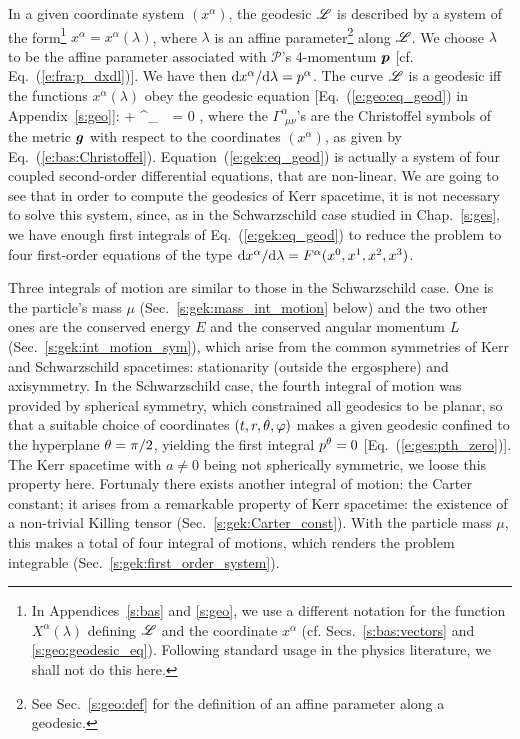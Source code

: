In a given coordinate system $(x^\alpha)$, the geodesic $\mathscr{L}$ is described
by a system of the form\footnote{In Appendices~\ref{s:bas} and \ref{s:geo},
we use a different notation for the function $X^\alpha(\lambda)$ defining
$\mathscr{L}$ and the coordinate $x^\alpha$ (cf. Secs.~\ref{s:bas:vectors} and
\ref{s:geo:geodesic_eq}). Following standard usage in the physics literature,
we shall not do this here.}
$x^\alpha = x^\alpha(\lambda)$, where $\lambda$ is an
affine parameter\footnote{See Sec.~\ref{s:geo:def} for the definition
of an affine parameter along a geodesic.} along $\mathscr{L}$. We choose $\lambda$ to be the affine parameter
associated with $\mathscr{P}$'s 4-momentum $\bm{p}$ [cf. Eq.~(\ref{e:fra:p_dxdl})]. We have
then $\mathrm{d} x^\alpha / \mathrm{d}\lambda = p^\alpha$.
The curve $\mathscr{L}$ is a geodesic iff the functions $x^\alpha(\lambda)$ obey
the geodesic equation [Eq.~(\ref{e:geo:eq_geod}) in Appendix~\ref{s:geo}]:
\be \label{e:gek:eq_geod}
     + \Gamma^\alpha_{\ \, \mu \nu}
      = 0 ,
\ee
where the $\Gamma^\alpha_{\ \, \mu \nu}$'s are the Christoffel symbols of the metric $\bm{g}$
with respect to the coordinates $(x^\alpha)$, as given by Eq.~(\ref{e:bas:Christoffel}).
Equation~(\ref{e:gek:eq_geod}) is actually a system of four coupled second-order
differential equations, that are non-linear. We are going to see that in
order to compute the geodesics of Kerr spacetime, it is not necessary to
solve this system, since, as in the Schwarzschild case studied in Chap.~\ref{s:ges}, we have
enough first integrals of Eq.~(\ref{e:gek:eq_geod}) to reduce
the problem to four first-order equations
of the type $\mathrm{d} x^\alpha/\mathrm{d}\lambda = F^\alpha(x^0, x^1, x^2, x^3)$.

Three integrals of motion are similar to those in the Schwarzschild case.
One is the particle's mass $\mu$ (Sec.~\ref{s:gek:mass_int_motion} below)
and the two other ones are
the conserved energy $E$ and the conserved angular momentum
$L$ (Sec.~\ref{s:gek:int_motion_sym}), which arise from the common symmetries
of Kerr and Schwarzschild spacetimes: stationarity (outside the ergosphere) and axisymmetry.
In the Schwarzschild case, the fourth integral of motion was provided by
spherical symmetry, which constrained all geodesics to be planar, so that
a suitable choice of
coordinates $(t,r,\theta,\varphi)$ makes a given geodesic confined to the
hyperplane $\theta=\pi/2$, yielding the first integral $p^\theta=0$ [Eq.~(\ref{e:ges:pth_zero})].
The Kerr spacetime with $a\not=0$ being not spherically symmetric, we loose
this property here. Fortunaly there exists another
integral of motion: the Carter constant; it arises from a remarkable property
of Kerr spacetime: the existence of a non-trivial Killing tensor (Sec.~\ref{s:gek:Carter_const}).
With the particle mass $\mu$, this makes a total of four integral of motions,
which renders the problem integrable (Sec.~\ref{s:gek:first_order_system}).


